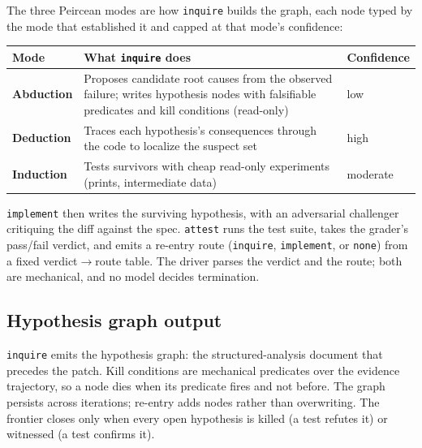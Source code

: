 \documentclass[
  10pt,
]{article}
\newcounter{none} %
\begin{document}
The three Peircean modes are how \texttt{inquire} builds the graph, each
node typed by the mode that established it and capped at that mode's
confidence:

{\def\LTcaptype{none} %
\begin{longtable}[]{@{}
  >{\raggedright\arraybackslash}p{}
  >{\raggedright\arraybackslash}p{}
  >{\raggedright\arraybackslash}p{}@{}}
\toprule\noalign{}
\begin{minipage}[b]{\linewidth}\raggedright
Mode
\end{minipage} & \begin{minipage}[b]{\linewidth}\raggedright
What \texttt{inquire} does
\end{minipage} & \begin{minipage}[b]{\linewidth}\raggedright
Confidence
\end{minipage} \\
\midrule\noalign{}
\endhead
\bottomrule\noalign{}
\endlastfoot
\textbf{Abduction} & Proposes candidate root causes from the observed
failure; writes hypothesis nodes with falsifiable predicates and kill
conditions (read-only) & low \\
\textbf{Deduction} & Traces each hypothesis's consequences through the
code to localize the suspect set & high \\
\textbf{Induction} & Tests survivors with cheap read-only experiments
(prints, intermediate data) & moderate \\
\end{longtable}
}

\texttt{implement} then writes the surviving hypothesis, with an
adversarial challenger critiquing the diff against the spec.
\texttt{attest} runs the test suite, takes the grader's pass/fail
verdict, and emits a re-entry route (\texttt{inquire},
\texttt{implement}, or \texttt{none}) from a fixed
verdict\(\rightarrow\)route table. The driver parses the verdict and the
route; both are mechanical, and no model decides termination.

\subsection{Hypothesis graph output}\label{recon-output}

\texttt{inquire} emits the hypothesis graph: the structured-analysis
document that precedes the patch. Kill conditions are mechanical
predicates over the evidence trajectory, so a node dies when its
predicate fires and not before. The graph persists across iterations;
re-entry adds nodes rather than overwriting. The frontier closes only
when every open hypothesis is killed (a test refutes it) or witnessed (a
test confirms it).
\end{document}
